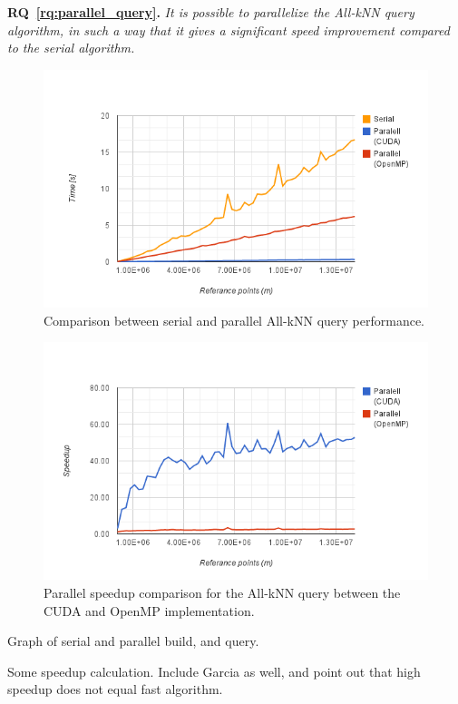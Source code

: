 \textbf{RQ~\ref{rq:parallel_query}.} \emph{It is possible to parallelize the All-kNN query algorithm, in such a way that it gives a significant speed improvement compared to the serial algorithm.}


\begin{figure}[ht]
    \centering
    \includegraphics[width=120mm]{../gfx/final_kd_search.png}
    \caption{Comparison between serial and parallel All-kNN query performance.}
    \label{fig:final_kd_search}
\end{figure}

\begin{figure}[ht]
    \centering
    \includegraphics[width=120mm]{../gfx/final_kd_search_speedup.png}
    \caption{Parallel speedup comparison for the All-kNN query between the CUDA and OpenMP implementation.}
    \label{fig:final_kd_search_speedup}
\end{figure}



Graph of serial and parallel build, and query.

Some speedup calculation. Include Garcia as well, and point out that high speedup does not equal fast algorithm.
